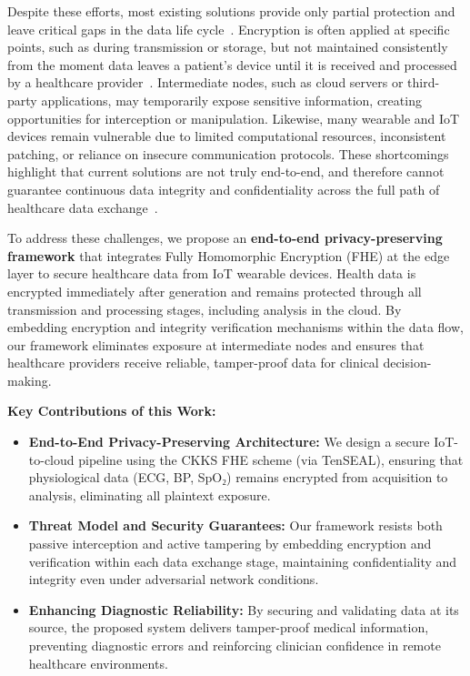\documentclass[review]{elsarticle}
\begin{document}
Despite these efforts, most existing solutions provide only partial protection and leave critical gaps in the data life cycle~\cite{qiu2020secure,trader2025real}. Encryption is often applied at specific points, such as during transmission or storage, but not maintained consistently from the moment data leaves a patient's device until it is received and processed by a healthcare provider~\cite{elhoseny2018secure}. Intermediate nodes, such as cloud servers or third-party applications, may temporarily expose sensitive information, creating opportunities for interception or manipulation. Likewise, many wearable and IoT devices remain vulnerable due to limited computational resources, inconsistent patching, or reliance on insecure communication protocols. These shortcomings highlight that current solutions are not truly end-to-end, and therefore cannot guarantee continuous data integrity and confidentiality across the full path of healthcare data exchange~\cite{trader2025real}.

To address these challenges, we propose an \textbf{end-to-end privacy-preserving framework} that integrates Fully Homomorphic Encryption (FHE) at the edge layer to secure healthcare data from IoT wearable devices. Health data is encrypted immediately after generation and remains protected through all transmission and processing stages, including analysis in the cloud. By embedding encryption and integrity verification mechanisms within the data flow, our framework eliminates exposure at intermediate nodes and ensures that healthcare providers receive reliable, tamper-proof data for clinical decision-making.

\noindent \textbf{Key Contributions of this Work:}

\begin{itemize}
\item \textbf{End-to-End Privacy-Preserving Architecture:}
We design a secure IoT-to-cloud pipeline using the CKKS FHE scheme (via TenSEAL), ensuring that physiological data (ECG, BP, SpO₂) remains encrypted from acquisition to analysis, eliminating all plaintext exposure.

\item \textbf{Threat Model and Security Guarantees:}
Our framework resists both passive interception and active tampering by embedding encryption and verification within each data exchange stage, maintaining confidentiality and integrity even under adversarial network conditions.

\item \textbf{Enhancing Diagnostic Reliability:}
By securing and validating data at its source, the proposed system delivers tamper-proof medical information, preventing diagnostic errors and reinforcing clinician confidence in remote healthcare environments.
\end{itemize}
\end{document}
